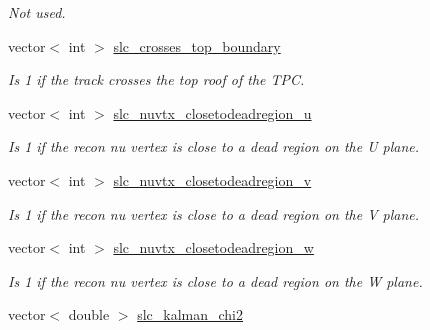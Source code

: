 \begin{DoxyCompactItemize}
\begin{DoxyCompactList}\small\item\em Not used. \end{DoxyCompactList}\item 
\hypertarget{classUBXSecEvent_ae7aee5c97b811d2e867cab5ec4fa1ffd}{vector$<$ int $>$ \hyperlink{classUBXSecEvent_ae7aee5c97b811d2e867cab5ec4fa1ffd}{slc\-\_\-crosses\-\_\-top\-\_\-boundary}}\label{classUBXSecEvent_ae7aee5c97b811d2e867cab5ec4fa1ffd}

\begin{DoxyCompactList}\small\item\em Is 1 if the track crosses the top roof of the T\-P\-C. \end{DoxyCompactList}\item 
\hypertarget{classUBXSecEvent_a702fda60b130a5de87b4cd5639b111d6}{vector$<$ int $>$ \hyperlink{classUBXSecEvent_a702fda60b130a5de87b4cd5639b111d6}{slc\-\_\-nuvtx\-\_\-closetodeadregion\-\_\-u}}\label{classUBXSecEvent_a702fda60b130a5de87b4cd5639b111d6}

\begin{DoxyCompactList}\small\item\em Is 1 if the recon nu vertex is close to a dead region on the U plane. \end{DoxyCompactList}\item 
\hypertarget{classUBXSecEvent_aea1570a2a53f22dcbbe2d0c349502a3b}{vector$<$ int $>$ \hyperlink{classUBXSecEvent_aea1570a2a53f22dcbbe2d0c349502a3b}{slc\-\_\-nuvtx\-\_\-closetodeadregion\-\_\-v}}\label{classUBXSecEvent_aea1570a2a53f22dcbbe2d0c349502a3b}

\begin{DoxyCompactList}\small\item\em Is 1 if the recon nu vertex is close to a dead region on the V plane. \end{DoxyCompactList}\item 
\hypertarget{classUBXSecEvent_a0e32deb7f9e8d3f4356b52dfa74892ad}{vector$<$ int $>$ \hyperlink{classUBXSecEvent_a0e32deb7f9e8d3f4356b52dfa74892ad}{slc\-\_\-nuvtx\-\_\-closetodeadregion\-\_\-w}}\label{classUBXSecEvent_a0e32deb7f9e8d3f4356b52dfa74892ad}

\begin{DoxyCompactList}\small\item\em Is 1 if the recon nu vertex is close to a dead region on the W plane. \end{DoxyCompactList}\item 
\hypertarget{classUBXSecEvent_a7b3a38020a5ff375b9a9632c6eda9845}{vector$<$ double $>$ \hyperlink{classUBXSecEvent_a7b3a38020a5ff375b9a9632c6eda9845}{slc\-\_\-kalman\-\_\-chi2}}\label{classUBXSecEvent_a7b3a38020a5ff375b9a9632c6eda9845}


\end{DoxyCompactItemize}
